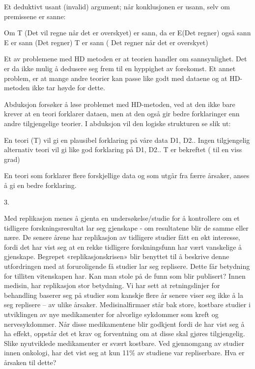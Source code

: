 \documentclass[
  letterpaper,
  DIV=11,
  numbers=noendperiod]{scrreprt}
\begin{document}
Et deduktivt usant (invalid) argument; når konklusjonen er usann, selv
om premissene er sanne:

Om T (Det vil regne når det er overskyet) er sann, da er E(Det regner)
også sann E er sann (Det regner) T er sann ( Det regner når det er
overskyet)

Et av problemene med HD metoden er at teorien handler om sannsynlighet.
Det er da ikke mulig å dedusere seg frem til en hyppighet av forekomst.
Et annet problem, er at mange andre teorier kan passe like godt med
dataene og at HD-metoden ikke tar høyde for dette.

Abduksjon forsøker å løse problemet med HD-metoden, ved at den ikke bare
krever at en teori forklarer dataen, men at den også gir bedre
forklaringer enn andre tilgjengelige teorier. I abduksjon vil den
logiske strukturen se slik ut:

En teori (T) vil gi en plausibel forklaring på våre data D1, D2.. Ingen
tilgjengelig alternativ teori vil gi like god forklaring på D1, D2.. T
er bekreftet ( til en viss grad)

En teori som forklarer flere forskjellige data og som utgår fra færre
årsaker, anses å gi en bedre forklaring.

3.

Med replikasjon menes å gjenta en undersøkelse/studie for å kontrollere
om et tidligere forskningsresultat lar seg gjenskape - om resultatene
blir de samme eller nære. De senere årene har replikasjon av tidligere
studier fått en økt interesse, fordi det har vist seg at en rekke
tidligere forskningsfunn har vært vanskelige å gjenskape. Begrepet
«replikasjonskrisen» blir benyttet til å beskrive denne utfordringen med
at foruroligende få studier lar seg replisere. Dette får betydning for
tilliten vitenskapen har. Kan man stole på de funn som blir publisert?
Innen medisin, har replikasjon stor betydning. Vi har sett at
retningslinjer for behandling baserer seg på studier som kanskje flere
år senere viser seg ikke å la seg replisere -- av ulike årsaker.
Medisinalfirmaer står bak store, kostbare studier i utviklingen av nye
medikamenter for alvorlige sykdommer som kreft og nervesykdommer. Når
disse medikamentene blir godkjent fordi de har vist seg å ha effekt,
oppstår det et krav og forventning om at disse skal gjøres tilgjengelig.
Slike nyutviklede medikamenter er svært kostbare. Ved gjennomgang av
studier innen onkologi, har det vist seg at kun 11\% av studiene var
repliserbare. Hva er årsaken til dette?
\end{document}
